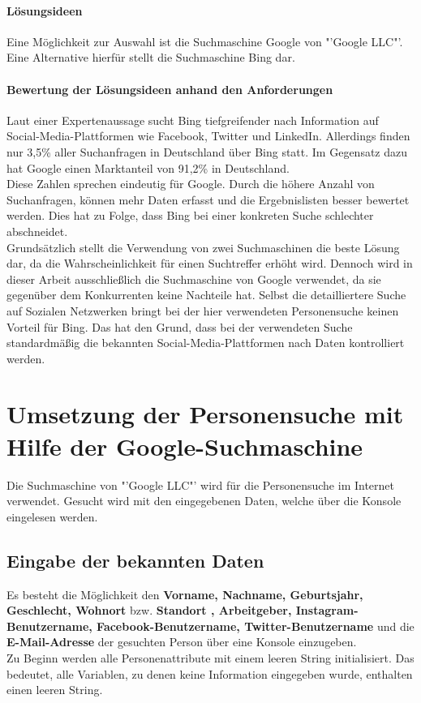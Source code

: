				\paragraph{Lösungsideen}
				Eine Möglichkeit zur Auswahl ist die Suchmaschine Google von "'Google LLC"'. Eine Alternative hierfür stellt die Suchmaschine Bing dar.
				\paragraph{Bewertung der Lösungsideen anhand den Anforderungen}
				Laut einer Expertenaussage sucht Bing tiefgreifender nach Information auf Social-Media-Plattformen wie Facebook, Twitter und LinkedIn. \cite{Suchmaschinen} Allerdings finden nur 3,5\% aller Suchanfragen in Deutschland über Bing statt. Im Gegensatz dazu hat Google einen Marktanteil von 91,2\% in Deutschland. \cite{Suchmaschinen}\\
				Diese Zahlen sprechen eindeutig für Google. Durch die höhere Anzahl von Suchanfragen, können mehr Daten erfasst und die Ergebnislisten besser bewertet werden. Dies hat zu Folge, dass Bing bei einer konkreten Suche schlechter abschneidet. \\
				Grundsätzlich stellt die Verwendung von zwei Suchmaschinen die beste Lösung dar, da die Wahrscheinlichkeit für einen Suchtreffer erhöht wird. Dennoch wird in dieser Arbeit ausschließlich die Suchmaschine von Google verwendet, da sie gegenüber dem Konkurrenten keine Nachteile hat. Selbst die detailliertere Suche auf Sozialen Netzwerken bringt bei der hier verwendeten Personensuche keinen Vorteil für Bing. Das hat den Grund, dass bei der verwendeten Suche standardmäßig die bekannten Social-Media-Plattformen nach Daten kontrolliert werden. 
		 	
\section{Umsetzung der Personensuche mit Hilfe der Google-Suchmaschine}
Die Suchmaschine von "'Google LLC"' wird für die Personensuche im Internet verwendet. Gesucht wird mit den eingegebenen Daten, welche über die Konsole eingelesen werden.

	\subsection{Eingabe der bekannten Daten}
	Es besteht die Möglichkeit den \textbf{Vorname, Nachname, Geburtsjahr, Geschlecht, Wohnort} bzw. \textbf{Standort , Arbeitgeber, Instagram-Benutzername, Facebook-Benutzername, Twitter-Benutzername} und die \textbf{E-Mail-Adresse} der gesuchten Person über eine Konsole einzugeben.\\
	Zu Beginn werden alle Personenattribute mit einem leeren String initialisiert. Das bedeutet, alle Variablen, zu denen keine Information eingegeben wurde, enthalten einen leeren String.
	

